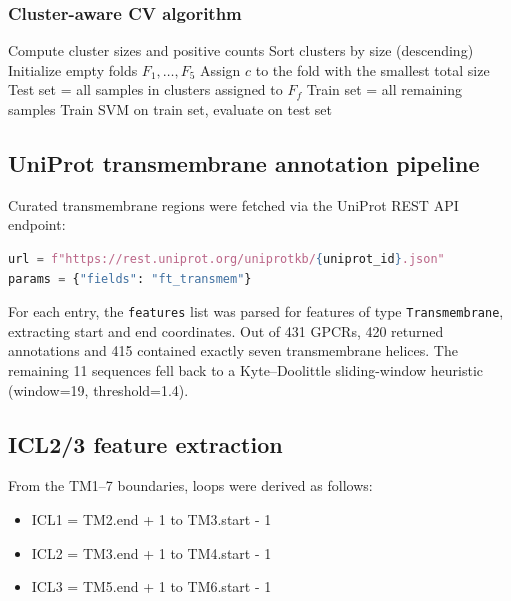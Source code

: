 \documentclass[11pt,a4paper]{article}
\begin{document}
\subsubsection{Cluster-aware CV algorithm}

\begin{algorithm}[H]
\caption{Cluster-aware cross-validation}
\begin{algorithmic}[1]
\State Compute cluster sizes and positive counts
\State Sort clusters by size (descending)
\State Initialize empty folds $F_1, \dots, F_5$
    \State Assign $c$ to the fold with the smallest total size
\EndFor
{}
    \State Test set = all samples in clusters assigned to $F_f$
    \State Train set = all remaining samples
    \State Train SVM on train set, evaluate on test set
\EndFor
\end{algorithmic}
\end{algorithm}

\subsection{UniProt transmembrane annotation pipeline}

Curated transmembrane regions were fetched via the UniProt REST API endpoint:
\begin{lstlisting}[language=Python]
url = f"https://rest.uniprot.org/uniprotkb/{uniprot_id}.json"
params = {"fields": "ft_transmem"}
\end{lstlisting}

For each entry, the \texttt{features} list was parsed for features of type \texttt{Transmembrane}, extracting start and end coordinates. Out of 431 GPCRs, 420 returned annotations and 415 contained exactly seven transmembrane helices. The remaining 11 sequences fell back to a Kyte--Doolittle sliding-window heuristic (window=19, threshold=1.4).

\subsection{ICL2/3 feature extraction}

From the TM1--7 boundaries, loops were derived as follows:
\begin{itemize}
    \item ICL1 = TM2.end + 1 to TM3.start - 1
    \item ICL2 = TM3.end + 1 to TM4.start - 1
    \item ICL3 = TM5.end + 1 to TM6.start - 1
\end{itemize}
\end{document}
